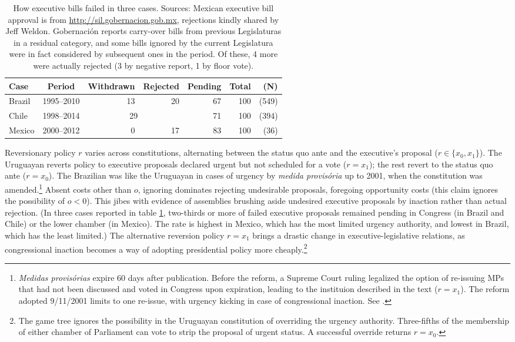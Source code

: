 \documentclass[letter,12pt]{article}
\newcommand{\mc}{\multicolumn}
\begin{document}
\begin{table}
\centering
\begin{tabular}{lcrrrrr}
Case   & Period     & Withdrawn & Rejected & Pending & Total & (N) \\ \hline
Brazil & 1995--2010 &  13       &   20     &   67    &  100  & (549) \\
Chile  & 1998--2014 & \mc{2}{c}{29}        &   71    &  100  & (394) \\
Mexico & 2000--2012 &   0       &   17     &   83    &  100  &  (36) \\
\end{tabular}
\caption{How executive bills failed in three cases. Sources: Mexican executive bill approval is from \protect\url{http://sil.gobernacion.gob.mx}, rejections kindly shared by Jeff Weldon. Gobernaci\'on reports carry-over bills from previous Legislaturas in a residual category, and some bills ignored by the current Legislatura were in fact considered by subsequent ones in the period. Of these, 4 more were actually rejected (3 by negative report, 1 by floor vote).}\label{t:exBillFail}
\end{table}

Reversionary policy $r$ varies across constitutions, alternating between the status quo ante and the executive's proposal ($r\in\{x_0,x_1\}$). The Uruguayan reverts policy to executive proposals declared urgent but not scheduled for a vote ($r=x_1$); the rest revert to the status quo ante ($r=x_0$). The Brazilian was like the Uruguayan in cases of urgency by \emph{medida provis\'oria} up to 2001, when the constitution was amended.\footnote{\emph{Medidas provis\'orias} expire 60 days after publication. Before the reform, a Supreme Court ruling legalized the option of re-issuing MPs that had not been discussed and voted in Congress upon expiration, leading to the instituion described in the text ($r=x_1$). The reform adopted 9/11/2001 limits to one re-issue, with urgency kicking in case of congressional inaction. See \citet{figueiredo.etal.1996}.} Absent costs other than $o$, ignoring dominates rejecting undesirable proposals, foregoing opportunity costs (this claim ignores the possibility of $o<0$). This jibes with evidence of assemblies brushing aside undesired executive proposals by inaction rather than actual rejection. (In three cases reported in table \ref{t:exBillFail}, two-thirds or more of failed executive proposals remained pending in Congress (in Brazil and Chile) or the lower chamber (in Mexico). The rate is highest in Mexico, which has the most limited urgency authority, and lowest in Brazil, which has the least limited.) The alternative reversion policy $r=x_1$ brings a drastic change in executive-legislative relations, as congressional inaction becomes a way of adopting presidential policy more cheaply.\footnote{The game tree ignores the possibility in the Uruguayan constitution of overriding the urgency authority. Three-fifths of the membership of either chamber of Parliament can vote to strip the proposal of urgent status. A successful override returns $r=x_0$.} 
\end{document}

